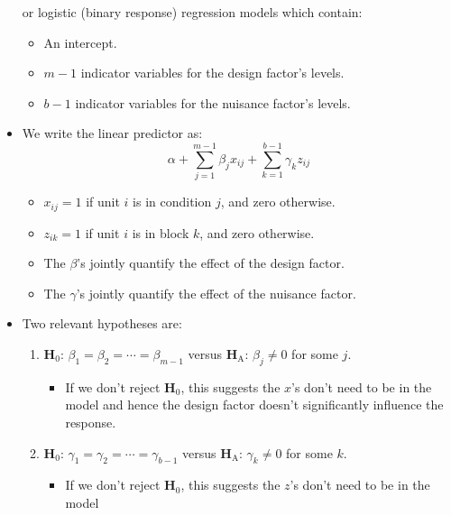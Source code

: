 \begin{itemize}
            or logistic (binary response) regression models which contain:
            \begin{itemize}
                  \item An intercept.
                  \item $ m-1 $ indicator variables for the design factor's levels.
                  \item $ b-1 $ indicator variables for the nuisance factor's levels.
            \end{itemize}
      \item We write the linear predictor as:
            \begin{equation}\tag{$\star$}
                  \alpha+\sum_{j=1}^{m-1} \beta_j x_{ij}+\sum_{k=1}^{b-1} \gamma_k z_{ij}\label{lpeqn}
            \end{equation}
            \begin{itemize}
                  \item $ x_{ij}=1 $ if unit $ i $ is in condition $ j $, and zero otherwise.
                  \item $ z_{ik}=1 $ if unit $ i $ is in block $ k $, and zero otherwise.
                  \item The $ \beta $'s jointly quantify the effect of the design factor.
                  \item The $ \gamma $'s jointly quantify the effect of the nuisance factor.
            \end{itemize}
      \item Two relevant hypotheses are:
            \begin{enumerate}[(1)]
                  \item $ \mathbf{H}_0 $: $ \beta_1=\beta_2=\cdots=\beta_{m-1} $ versus $ \mathbf{H}_\text{A} $: $ \beta_j\ne 0 $ for some $ j $.
                        \begin{itemize}
                              \item If we don't reject $ \mathbf{H}_0 $, this suggests the $ x $'s don't need to be in the model
                                    and hence the design factor doesn't significantly influence the response.
                        \end{itemize}
                  \item $ \mathbf{H}_0 $: $ \gamma_1=\gamma_2=\cdots=\gamma_{b-1} $ versus $ \mathbf{H}_\text{A} $: $ \gamma_k\ne 0 $ for some $ k $.
                        \begin{itemize}
                              \item If we don't reject $ \mathbf{H}_0 $, this suggests the $ z $'s don't need to be in the model

\end{itemize}
\end{enumerate}
\end{itemize}
